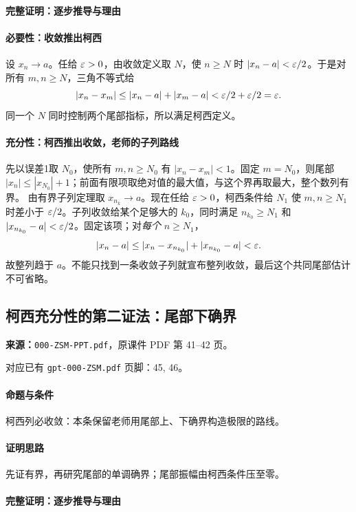 \paragraph{完整证明：逐步推导与理由}

\paragraph{必要性：收敛推出柯西}设 $x_n\to a$。任给 $\varepsilon>0$，由收敛定义取 $N$，使 $n\ge N$ 时 $|x_n-a|<\varepsilon/2$。于是对所有 $m,n\ge N$，三角不等式给
\[|x_n-x_m|\le|x_n-a|+|x_m-a|<\varepsilon/2+\varepsilon/2=\varepsilon.\]
同一个 $N$ 同时控制两个尾部指标，所以满足柯西定义。
\paragraph{充分性：柯西推出收敛，老师的子列路线}
先以误差1取 $N_0$，使所有 $m,n\ge N_0$ 有 $|x_n-x_m|<1$。固定 $m=N_0$，则尾部 $|x_n|\le|x_{N_0}|+1$；前面有限项取绝对值的最大值，与这个界再取最大，整个数列有界。
由有界子列定理取 $x_{n_k}\to a$。现在任给 $\varepsilon>0$，柯西条件给 $N_1$ 使 $m,n\ge N_1$ 时差小于 $\varepsilon/2$。子列收敛给某个足够大的 $k_0$，同时满足 $n_{k_0}\ge N_1$ 和 $|x_{n_{k_0}}-a|<\varepsilon/2$。固定该项；对\emph{每个} $n\ge N_1$，
\[|x_n-a|\le|x_n-x_{n_{k_0}}|+|x_{n_{k_0}}-a|<\varepsilon.\]
故整列趋于 $a$。不能只找到一条收敛子列就宣布整列收敛，最后这个共同尾部估计不可省略。

\clearpage\subsection{柯西充分性的第二证法：尾部下确界}
\textbf{来源：}\texttt{000-ZSM-PPT.pdf}，原课件 PDF 第 41--42 页。\par
对应已有 \texttt{gpt-000-ZSM.pdf} 页脚：45, 46。\par
\paragraph{命题与条件}柯西列必收敛：本条保留老师用尾部上、下确界构造极限的路线。
\paragraph{证明思路}先证有界，再研究尾部的单调确界；尾部振幅由柯西条件压至零。
\paragraph{完整证明：逐步推导与理由}

